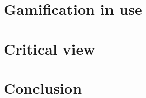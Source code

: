 \documentclass[10pt,english,a4paper]{article}
\begin{document}
\section{Gamification in use} \label{section4}



\section{Critical view} \label{section5}



\section{Conclusion} \label{section6}





\end{document}
